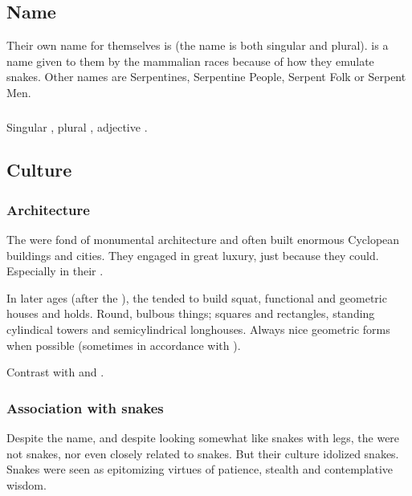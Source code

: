 \subsection{Name}
Their own name for themselves is \caisith (the name is both singular and plural). 
\quo{\Ophidian} is a name given to them by the mammalian races because of how they emulate snakes. 
Other names are Serpentines, Serpentine People, Serpent Folk or Serpent Men. 





\subsubsection{\QuilJaar}
Singular \emph{\quiljaar{}}, plural \emph{\quiljaaran{}}, adjective \emph{\quiljaaran{}}. 









\subsection{Culture}





\subsubsection{Architecture}
The \ophidians{} were fond of monumental architecture and often built enormous Cyclopean buildings and cities.
They engaged in great luxury, just because they could. 
Especially in their . 

In later ages (after the \firstbanewar), the \ophidians tended to build squat, functional and geometric houses and holds. 
Round, bulbous things; squares and rectangles, standing cylindical towers and semicylindrical longhouses. 
Always nice geometric forms when possible (sometimes in accordance with ). 

Contrast with  and . 





\subsubsection{Association with snakes}
Despite the name, and despite looking somewhat like snakes with legs, the \ophidians{} were not snakes, nor even closely related to snakes. 
But their culture idolized snakes. 
Snakes were seen as epitomizing virtues of patience, stealth and contemplative wisdom. 

